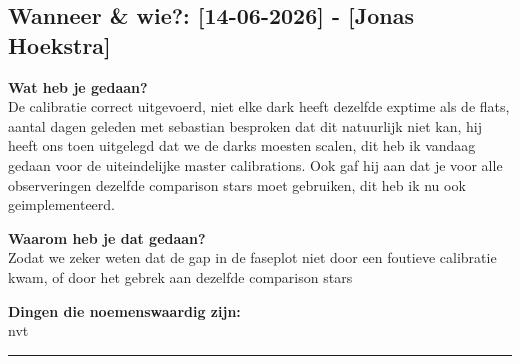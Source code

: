
\subsection*{Wanneer \& wie?: [14-06-2026] - [Jonas Hoekstra]}

\textbf{Wat heb je gedaan?}\\
De calibratie correct uitgevoerd, niet elke dark heeft dezelfde exptime als de flats, aantal dagen geleden met sebastian besproken dat dit natuurlijk niet kan, hij heeft ons toen uitgelegd dat we de darks moesten scalen, dit heb ik vandaag gedaan voor de uiteindelijke master calibrations. Ook gaf hij aan dat je voor alle observeringen dezelfde comparison stars moet gebruiken, dit heb ik nu ook geimplementeerd.
\vspace{0.3cm} 

\noindent \textbf{Waarom heb je dat gedaan?}\\
Zodat we zeker weten dat de gap in de faseplot niet door een foutieve calibratie kwam, of door het gebrek aan dezelfde comparison stars

\noindent \textbf{Dingen die noemenswaardig zijn:}\\
nvt


\vspace{0.5cm}
\hrule 
\vspace{0.5cm}
